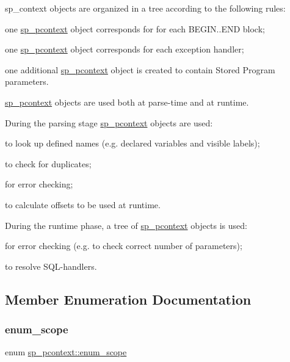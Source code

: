 sp\+\_\+context objects are organized in a tree according to the following rules\+:
\begin{DoxyItemize}
\item one \mbox{\hyperlink{classsp__pcontext}{sp\+\_\+pcontext}} object corresponds for for each B\+E\+G\+IN..E\+ND block;
\item one \mbox{\hyperlink{classsp__pcontext}{sp\+\_\+pcontext}} object corresponds for each exception handler;
\item one additional \mbox{\hyperlink{classsp__pcontext}{sp\+\_\+pcontext}} object is created to contain Stored Program parameters.
\end{DoxyItemize}

\mbox{\hyperlink{classsp__pcontext}{sp\+\_\+pcontext}} objects are used both at parse-\/time and at runtime.

During the parsing stage \mbox{\hyperlink{classsp__pcontext}{sp\+\_\+pcontext}} objects are used\+:
\begin{DoxyItemize}
\item to look up defined names (e.\+g. declared variables and visible labels);
\item to check for duplicates;
\item for error checking;
\item to calculate offsets to be used at runtime.
\end{DoxyItemize}

During the runtime phase, a tree of \mbox{\hyperlink{classsp__pcontext}{sp\+\_\+pcontext}} objects is used\+:
\begin{DoxyItemize}
\item for error checking (e.\+g. to check correct number of parameters);
\item to resolve S\+QL-\/handlers. 
\end{DoxyItemize}

\subsection{Member Enumeration Documentation}
\mbox{\label{classsp__pcontext_a6252258e34c191cbf1b5e86628cd29c6}} 
\subsubsection{\texorpdfstring{enum\+\_\+scope}{enum\_scope}}
{\footnotesize\ttfamily enum \mbox{\hyperlink{classsp__pcontext_a6252258e34c191cbf1b5e86628cd29c6}{sp\+\_\+pcontext\+::enum\+\_\+scope}}}

